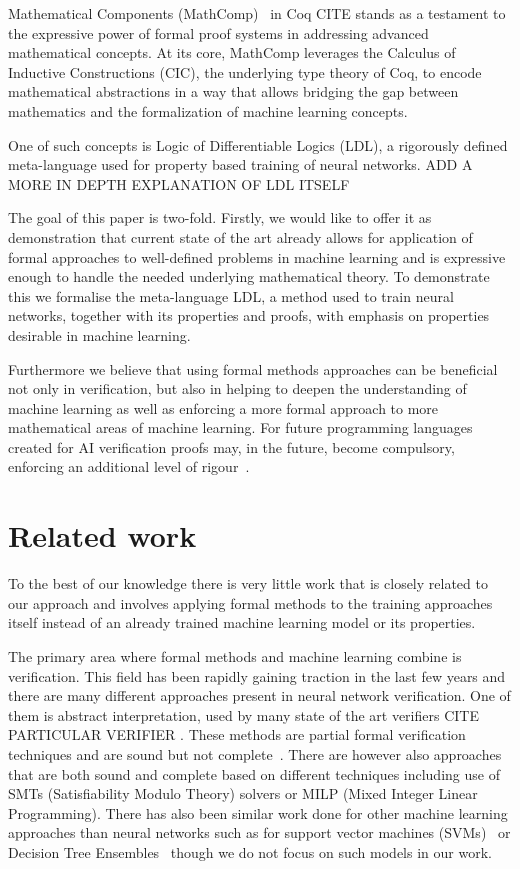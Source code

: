 \documentclass[a4paper,10pt]{article}
\begin{document}
Mathematical Components (MathComp)~\cite{mathcomp} in Coq CITE stands as a testament to the expressive power of formal proof systems in addressing advanced mathematical concepts. At its core, MathComp leverages the Calculus of Inductive Constructions (CIC), the underlying type theory of Coq, to encode mathematical abstractions in a way that allows bridging the gap between mathematics and the formalization of machine learning concepts. 

One of such concepts is Logic of Differentiable Logics (LDL), a rigorously defined meta-language used for property based training of neural networks. ADD A MORE IN DEPTH EXPLANATION OF LDL ITSELF

The goal of this paper is two-fold. Firstly, we would like to offer it as demonstration that current state of the art already allows for application of formal approaches to well-defined problems in machine learning and is expressive enough to handle the needed underlying mathematical theory. To demonstrate this we formalise the meta-language LDL, a method used to train neural networks, together with its properties and proofs, with emphasis on properties desirable in machine learning.

Furthermore we believe that using formal methods approaches can be beneficial not only in verification, but also in helping to deepen the understanding of machine learning as well as enforcing a more formal approach to more mathematical areas of machine learning. 
For future programming languages created for AI verification  proofs may, in the future, become compulsory, enforcing an additional level of rigour~\cite{FoMLAS2023:Vehicle_Tutorial_Neural_Network,seshia2022toward}. 

\section{Related work}

To the best of our knowledge there is very little work that is closely related to our approach and involves applying formal methods to the training approaches itself instead of an already trained machine learning model or its properties.

The primary area where formal methods and machine learning combine is verification. This field has been rapidly gaining traction in the last few years and there are many different approaches present in neural network verification\cite{urban2021review,9842406}. One of them is abstract interpretation, used by many state of the art verifiers CITE PARTICULAR VERIFIER . These methods are partial formal verification techniques and are sound but not complete~\cite{easterbrook1998formal}. There are however also approaches that are both sound and complete based on different techniques including use of SMTs (Satisfiability Modulo Theory) \cite{katz2019marabou} solvers or MILP (Mixed Integer Linear Programming). There has also been similar work done for other machine learning approaches than neural networks such as for support vector machines (SVMs)~\cite{ranzato2019robustness} or Decision Tree Ensembles~\cite{einziger2019verifying} though we do not focus on such models in our work. 
\end{document}
